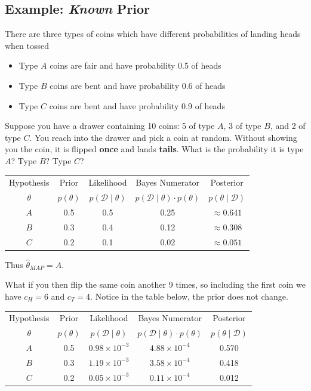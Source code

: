 \subsection{Example: \textit{Known} Prior}
There are three types of coins which have different probabilities of landing heads when tossed
\begin{itemize}
\item[] Type $A$ coins are fair and have probability 0.5 of heads
\item[] Type $B$ coins are bent and have probability 0.6 of heads
\item[] Type $C$ coins are bent and have probability 0.9 of heads
\end{itemize}

Suppose you have a drawer containing 10 coins: 
5 of type $A$, 3 of type $B$, and 2 of type $C$. 
You reach into the drawer and pick a coin at random. 
Without showing you the coin, it is flipped \textbf{once} and lands \textbf{tails}. 
What is the probability it is type $A$? Type $B$? Type $C$? 

\begin{center}
\begin{tabular}{|c||c|c|c|c|}
\hline
Hypothesis & Prior & Likelihood & Bayes Numerator & Posterior\\
$\theta$ & $p(\theta)$ & $p(\mathcal{D}\mid\theta)$ & $p(\mathcal{D}\mid\theta)\cdot p(\theta)$ & $p(\theta\mid\mathcal{D})$\\
\hline
\hline
$A$	& 0.5		& 0.5		& 0.25	& $\approx0.641$\\
$B$	& 0.3		& 0.4		& 0.12	& $\approx0.308$\\
$C$	& 0.2		& 0.1		& 0.02	& $\approx0.051$\\
\hline
\end{tabular}
\end{center}

Thus $\hat\theta_{MAP} = A$. 

What if you then flip the same coin another 9 times, so including the first coin we have 
$c_H=6$ and $c_T=4$.
Notice in the table below, the prior does not change. 

\begin{center}
\begin{tabular}{|c||c|c|c|c|}
\hline
Hypothesis & Prior & Likelihood & Bayes Numerator & Posterior\\
$\theta$ & $p(\theta)$ & $p(\mathcal{D}\mid\theta)$ & $p(\mathcal{D}\mid\theta)\cdot p(\theta)$ & $p(\theta\mid\mathcal{D})$\\
\hline
\hline
$A$	& 0.5		& $0.98\times10^{-3}$ & $4.88\times10^{-4}$	& 0.570\\
$B$	& 0.3		& $1.19\times10^{-3}$ & $3.58\times10^{-4}$	& 0.418\\
$C$	& 0.2		& $0.05\times10^{-3}$ & $0.11\times10^{-4}$	& 0.012\\
\hline
\end{tabular}
\end{center}

